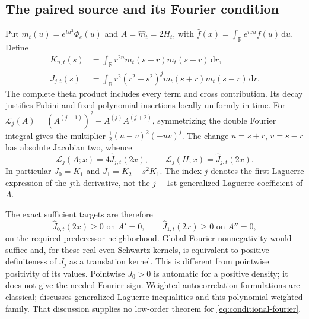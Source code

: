 \documentclass[11pt]{article}
\theoremstyle{definition}
\theoremstyle{remark}
\newcommand{\dd}{\,\mathrm d}
\begin{document}
\subsection{The paired source and its Fourier condition}

Put $m_t(u)=e^{tu^2}\Phi_e(u)$ and $A=\widehat m_t=2H_t$, with
$\widehat f(x)=\int_{\mathbb R}e^{ixu}f(u)\dd u$. Define
\begin{align}
 K_{n,t}(s)&=\int_{\mathbb R}r^{2n}m_t(s+r)m_t(s-r)\dd r,\nonumber\\
 J_{j,t}(s)&=\int_{\mathbb R}r^2(r^2-s^2)^j
       m_t(s+r)m_t(s-r)\dd r.\label{eq:laguerre-kernels}
\end{align}
The complete theta product includes every term and cross contribution.
Its decay justifies Fubini and fixed polynomial insertions locally
uniformly in time. For
$\mathscr L_j(A)=(A^{(j+1)})^2-A^{(j)}A^{(j+2)}$, symmetrizing the
double Fourier integral gives the multiplier
$\tfrac12(u-v)^2(-uv)^j$. The change $u=s+r$, $v=s-r$ has absolute
Jacobian two, whence
\begin{equation}
 \mathscr L_j(A;x)=4\widehat J_{j,t}(2x),\qquad
 \mathscr L_j(H;x)=\widehat J_{j,t}(2x).
 \label{eq:laguerre-fourier}
\end{equation}
In particular $J_0=K_1$ and $J_1=K_2-s^2K_1$. The index $j$ denotes
the first Laguerre expression of the $j$th derivative, not the $j+1$st
generalized Laguerre coefficient of $A$.

The exact sufficient targets are therefore
\begin{equation}
 \widehat J_{0,t}(2x)\ge0\text{ on }A'=0,\qquad
 \widehat J_{1,t}(2x)\ge0\text{ on }A''=0,
 \label{eq:conditional-fourier}
\end{equation}
on the required predecessor neighborhood. Global Fourier nonnegativity
would suffice and, for these real even Schwartz kernels, is equivalent
to positive definiteness of $J_j$ as a translation kernel. This is
different from pointwise positivity of its values. Pointwise $J_0>0$
is automatic for a positive density; it does not give the needed
Fourier sign. Weighted-autocorrelation formulations are classical;
\cite[Theorem 3.7 and Open Problems 4.7, 4.11]{csordas} discusses
generalized Laguerre inequalities and this polynomial-weighted family.
That discussion supplies no low-order theorem for
\eqref{eq:conditional-fourier}.
\end{document}
